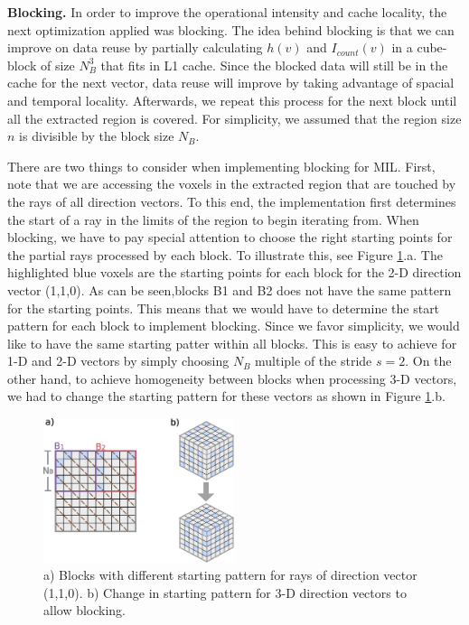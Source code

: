 \documentclass[letterpaper]{article}
\newcommand{\mypar}[1]{{\bf #1.}}
\begin{document}
\mypar{Blocking}
In order to improve the operational intensity and cache locality, the next optimization applied was blocking. The idea behind blocking is that we can improve on data reuse by partially calculating $h(v)$ and $I_{count}(v)$ in a cube-block of size $N_B^3$ that fits in L1 cache. Since the blocked data will still be in the cache for the next vector, data reuse will improve by taking advantage of spacial and temporal locality. Afterwards, we repeat this process for the next block until all the extracted region is covered. For simplicity, we assumed that the region size $n$ is divisible by the block size $N_B$.

There are two things to consider when implementing blocking for MIL. First, note that we are accessing the voxels in the extracted region that are touched by the rays of all direction vectors. To this end, the implementation first determines the start of a ray in the limits of the region to begin iterating from. When blocking, we have to pay special attention to choose the right starting points for the partial rays processed by each block. To illustrate this, see Figure \ref{fig:start_pattern}.a. The highlighted blue voxels are the starting points for each block for the 2-D direction vector (1,1,0). As can be seen,blocks B1 and B2 does not have the same pattern for the starting points. This means that we would have to determine the start pattern for each block to implement blocking. Since we favor simplicity, we would like to have the same starting patter within all blocks. This is easy to achieve for 1-D and 2-D vectors by simply choosing $N_B$ multiple of the stride $s=2$. On the other hand, to achieve homogeneity between blocks when processing 3-D vectors, we had to change the starting pattern for these vectors as shown in Figure \ref{fig:start_pattern}.b.

\begin{figure}[H]
    \centering
    \includegraphics[width=2.2in]{figs/heterogeneous_blocking.eps}
    \caption{a) Blocks with different starting pattern for rays of direction vector (1,1,0). b) Change in starting pattern for 3-D direction vectors to allow blocking.}
    \label{fig:start_pattern}
\end{figure}
\end{document}
